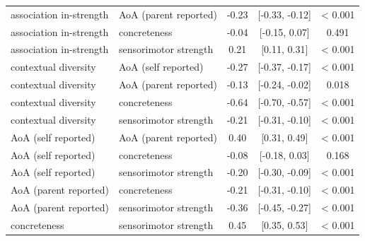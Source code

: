 \begin{tabular}{llccc}
  association in-strength & AoA (parent reported) & -0.23 & [-0.33, -0.12] & < 0.001 \\ 
  association in-strength & concreteness & -0.04 & [-0.15, 0.07] & 0.491 \\ 
  association in-strength & sensorimotor strength & 0.21 & [0.11, 0.31] & < 0.001 \\ 
  contextual diversity & AoA (self reported) & -0.27 & [-0.37, -0.17] & < 0.001 \\ 
  contextual diversity & AoA (parent reported) & -0.13 & [-0.24, -0.02] & 0.018 \\ 
  contextual diversity & concreteness & -0.64 & [-0.70, -0.57] & < 0.001 \\ 
  contextual diversity & sensorimotor strength & -0.21 & [-0.31, -0.10] & < 0.001 \\ 
  AoA (self reported) & AoA (parent reported) & 0.40 & [0.31, 0.49] & < 0.001 \\ 
  AoA (self reported) & concreteness & -0.08 & [-0.18, 0.03] & 0.168 \\ 
  AoA (self reported) & sensorimotor strength & -0.20 & [-0.30, -0.09] & < 0.001 \\ 
  AoA (parent reported) & concreteness & -0.21 & [-0.31, -0.10] & < 0.001 \\ 
  AoA (parent reported) & sensorimotor strength & -0.36 & [-0.45, -0.27] & < 0.001 \\ 
  concreteness & sensorimotor strength & 0.45 & [0.35, 0.53] & < 0.001 \\ 
   \hline
\end{tabular}
